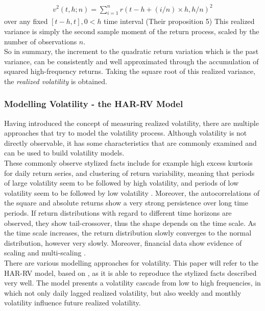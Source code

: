 \begin{align}\label{eq:RV-andersen}
v^2(t,h;n) = \sum_{i=1}^{n} r(t-h+(i/n) \times h,h/n)^2
\end{align}
over any fixed $[t-h,t], 0 < h$ time interval (Their proposition 5) This realized variance is simply the second sample moment of the return process, scaled by the number of observations $n$.\\
So in summary, the increment to the quadratic return variation which is the past variance, can be consistently and well approximated through the accumulation of squared high-frequency returns. Taking the square root of this realized variance, the \emph{realized volatility} is obtained.


\subsubsection{Modelling Volatility - the HAR-RV Model}\label{sec:222HAR-RV}
Having introduced the concept of measuring realized volatility, there are multiple approaches that try to model the volatility process. Although volatility is not directly observable, it has some characteristics that are commonly examined and can be used to build volatility models. \\
These commonly observe stylized facts include for example high excess kurtosis for daily return series, and clustering of return variability, meaning that periods of large volatility seem to be followed by high volatility, and periods of low volatility seem to be followed by low volatility \parencite{tsay2005}. Moreover, the autocorrelations of the square and absolute returns show a very strong persistence over long time periods. If return distributions with regard to different time horizons are observed, they show tail-crossover, thus the shape depends on the time scale. As the time scale increases, the return distribution slowly converges to the normal distribution, however very slowly. Moreover, financial data show evidence of scaling and multi-scaling \textcite{corsi2009}. \\
There are various modelling approaches for volatility. This paper will refer to the HAR-RV model, based on \textcite{corsi2009}, as it is able to reproduce the stylized facts described very well. The model presents a volatility cascade from low to high frequencies, in which not only daily lagged realized volatility, but also weekly and monthly volatility influence future realized volatility.\\
